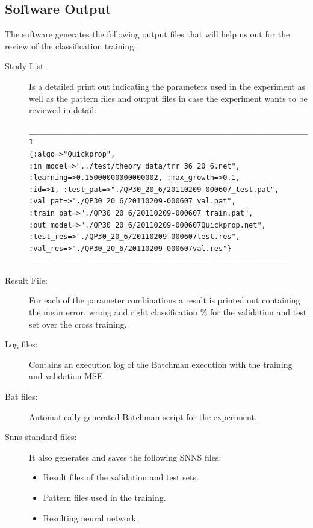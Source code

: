 \documentclass[a4paper,10pt,titlepage]{article}
\begin{document}
\subsection{Software Output}

\par The software generates the following output files that will help us out for the review of the classification training:

\begin{description}
	\item[Study List:] Is a detailed print out indicating the parameters used in the experiment as well as the pattern files and output files in case the experiment wants to be reviewed in detail:
	{\footnotesize\begin{verbatim}
______________________________________________________________________________________
1
{:algo=>"Quickprop", :in_model=>"../test/theory_data/trr_36_20_6.net", :learning=>0.15000000000000002, :max_growth=>0.1, 
:id=>1, :test_pat=>"./QP30_20_6/20110209-000607_test.pat", :val_pat=>"./QP30_20_6/20110209-000607_val.pat", 
:train_pat=>"./QP30_20_6/20110209-000607_train.pat", :out_model=>"./QP30_20_6/20110209-000607Quickprop.net", 
:test_res=>"./QP30_20_6/20110209-000607test.res", :val_res=>"./QP30_20_6/20110209-000607val.res"}
______________________________________________________________________________________
	\end{verbatim}}
	
	\item[Result File:] For each of the parameter combinations a result is printed out containing the mean error, wrong and right classification \% for the validation and test set over the cross training.
	\item[Log files:] Contains an execution log of the Batchman execution with the training and validation MSE.
	\item[Bat files:] Automatically generated Batchman script for the experiment.
	\item[Snns standard files:] It also generates and saves the following SNNS files:
	\begin{itemize}
		\item Result files of the validation and test sets.
		\item Pattern files used in the training.
		\item Resulting neural network.
	\end{itemize}
\end{description}
\end{document}
